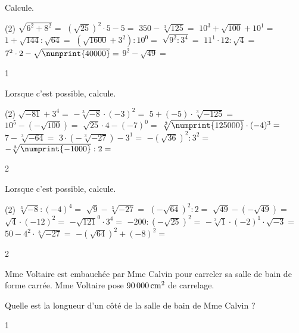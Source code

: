 \documentclass[a4paper,11pt]{report}
\begin{document}
\newpage
\begin{exop}{%
Calcule.
\begin{tasks}(2)
    \task $\sqrt{6^2+8^2}=$
    \task $(\sqrt{25})^2\cdot5-5=$
    \task $350-\sqrt[3]{125}=$
    \task $10^3+\sqrt{100}+10^1=$
    \task $1+\sqrt{144}:\sqrt{64}=$
    \task $(\sqrt{1600}+3^2):10^0=$
    \task $\sqrt{9^2:3^4}=$
    \task $11^1\cdot12:\sqrt{4}=$
    \task $7^2\cdot2-\sqrt{\numprint{40000}}=$
    \task $9^2-\sqrt{49}=$
\end{tasks}
}{1}    
\end{exop}


\begin{exop}{%
Lorsque c'est possible, calcule.
\begin{tasks}(2)
    \task $\sqrt{-81}+3^4=$
    \task $-\sqrt[3]{-8}\cdot(-3)^2=$
    \task $5+(-5)\cdot\sqrt[3]{-125}=$
    \task $10^5-(-\sqrt{100})=$
    \task $\sqrt{25}\cdot4-(-7)^0=$
    \task $\sqrt[3]{\numprint{125000}}\cdot(-4)^3=$
    \task $7-\sqrt[3]{-64}=$
    \task $3\cdot(-\sqrt[3]{-27})-3^1=$
    \task $-(\sqrt{36})^2:3^2=$
    \task $-\sqrt[3]{\numprint{-1000}}:2=$
\end{tasks}
}{2}    
\end{exop}

\newpage
\begin{exop}{%
Lorsque c'est possible, calcule.
\begin{tasks}(2)
    \task $\sqrt[3]{-8}:(-4)^4=$
    \task $\sqrt{9}-\sqrt[3]{-27}=$
    \task $(-\sqrt{64})^2:2=$
    \task $\sqrt{49}-(-\sqrt{49})=$
    \task $\sqrt{4}\cdot(-12)^2=$
    \task $-\sqrt{121}^0\cdot3^4=$
    \task $-200:(-\sqrt{25})^2=$
    \task $-\sqrt[3]{1}\cdot(-2)^1\cdot\sqrt{-3}=$
    \task $50-4^2\cdot\sqrt[3]{-27}=$
    \task $-(\sqrt{64})^2+(-8)^2=$
\end{tasks}
}{2}    
\end{exop}











\begin{exo}{
    Mme Voltaire est embauchée par Mme Calvin pour carreler sa salle de bain de forme carrée. Mme Voltaire pose $\tunit{90000}{\centi m^2}$ de carrelage.
    
    Quelle est la longueur d'un côté de la salle de bain de Mme Calvin ?
}{1}    
\end{exo}
\end{document}
